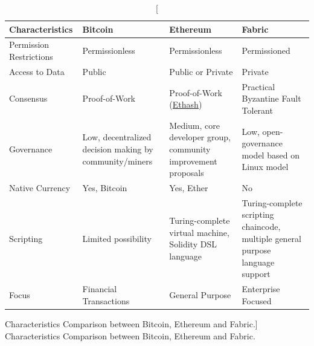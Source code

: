 \begin{table}[h!]
	\centering
	
	\begin{tabular}{ p{4cm} p{3.4cm} p{4cm} p{4.4cm} }
    \textbf{Characteristics} & \textbf{Bitcoin} & \textbf{Ethereum} &
    \textbf{Fabric} \\ \hline
    Permission Restrictions & Permissionless & Permissionless & Permissioned
    \\[7pt] Access to Data & Public & Public or Private & Private \\[7pt]
    Consensus & Proof-of-Work & Proof-of-Work
    (\href{https://github.com/ethereum/wiki/wiki/Ethash}{Ethash}) & Practical
    Byzantine Fault Tolerant \\[7pt] Governance & Low, decentralized decision
    making by community/miners & Medium, core developer group, community
    improvement proposals & Low, open-governance model based on Linux model
    \\[7pt] Native Currency & Yes, Bitcoin & Yes, Ether & No \\[7pt] Scripting
    & Limited possibility & Turing-complete virtual machine, Solidity DSL
    language & Turing-complete scripting chaincode, multiple general purpose
    language support \\[7pt] Focus & Financial Transactions & General Purpose &
    Enterprise Focused \\
		\hline
	\end{tabular}
	
	\caption
	[Characteristics Comparison between Bitcoin, Ethereum and Fabric.]
	{Characteristics Comparison between Bitcoin, Ethereum and Fabric.}
	
	\label{tab:blockchainComparison}
\end{table}

